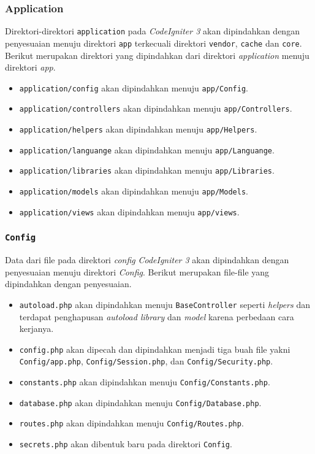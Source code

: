 \subsubsection{Application}
Direktori-direktori \texttt{application} pada \textit{CodeIgniter 3} akan dipindahkan dengan penyesuaian menuju direktori \texttt{app} terkecuali direktori \texttt{vendor}, \texttt{cache} dan \texttt{core}. Berikut merupakan direktori yang dipindahkan dari direktori \textit{application} menuju direktori \textit{app}.
\begin{itemize}
\item \verb|application/config| akan dipindahkan menuju \texttt{app/Config}.
\item \verb|application/controllers| akan dipindahkan menuju \texttt{app/Controllers}.
\item \verb|application/helpers| akan dipindahkan menuju \texttt{app/Helpers}.
\item \verb|application/languange| akan dipindahkan menuju \texttt{app/Languange}.
\item \verb|application/libraries| akan dipindahkan menuju \texttt{app/Libraries}.
\item \verb|application/models| akan dipindahkan menuju \texttt{app/Models}.
\item \verb|application/views| akan dipindahkan menuju \texttt{app/views}.
\end{itemize}

\subsubsection{\texttt{Config}}
\label{subsubsec:configbab3usulan}
Data dari file pada direktori \textit{config} \textit{CodeIgniter 3} akan dipindahkan dengan penyesuaian menuju direktori \textit{Config}. Berikut merupakan file-file yang dipindahkan dengan penyesuaian.
\begin{itemize}
	\item \verb|autoload.php| akan dipindahkan menuju \texttt{BaseController} seperti \textit{helpers} dan terdapat penghapusan \textit{autoload library} dan \textit{model} karena perbedaan cara kerjanya.
	\item \verb|config.php| akan dipecah dan dipindahkan menjadi tiga buah file yakni \texttt{Config/app.php}, \texttt{Config/Session.php}, dan \texttt{Config/Security.php}.
	\item \verb|constants.php| akan dipindahkan menuju \texttt{Config/Constants.php}.
	\item \verb|database.php| akan dipindahkan menuju \texttt{Config/Database.php}.
	\item \verb|routes.php| akan dipindahkan menuju \texttt{Config/Routes.php}.
	\item \verb|secrets.php| akan dibentuk baru pada direktori \texttt{Config}.
\end{itemize}

